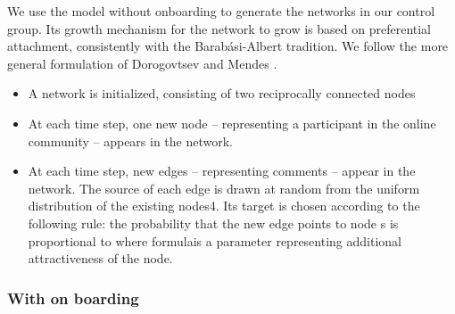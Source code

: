 We use the model without onboarding to generate the networks in our control group. Its growth mechanism for the network to grow is based on preferential attachment, consistently with the Barabási-Albert tradition. We follow the more general formulation of Dorogovtsev and Mendes \cite{dorogovtsev2002evolution}.
\begin{itemize}
\item A network is initialized, consisting of two reciprocally connected nodes
\item At each time step, one new node – representing a participant in the online community – appears in the network. 
\item At each time step,  new edges – representing comments – appear in the network. The source of each edge is drawn at random from the uniform distribution of the existing nodes4. Its target is chosen according to the following rule: the probability that the new edge points to node s is proportional to where formulais a parameter representing additional attractiveness of the node.
\end{itemize}

\subsubsection*{With on boarding}

